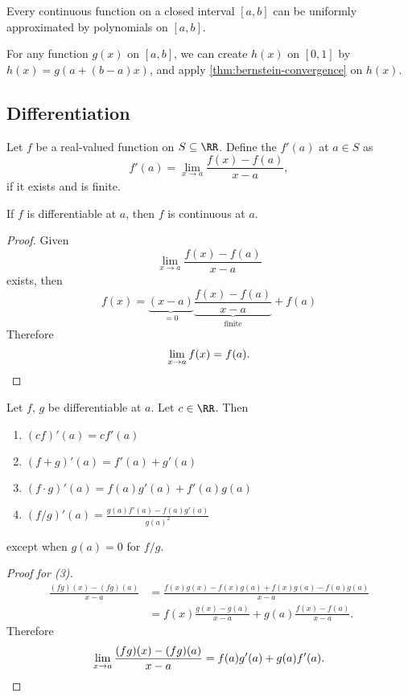 \documentclass[11pt]{scrartcl}
\numberwithin{equation}{section}
\begin{document}
\begin{theorem}
    \label{thm:weierstrassapproxthm}
    Every continuous function on a closed interval $[a,b]$  can 
    be uniformly approximated by polynomials on $[a,b]$.
\end{theorem}
For any function $g(x)$ on $[a,b]$, we can create $h(x)$ on $[0,1]$ 
by $h(x)=g(a+(b-a)x)$, and apply \cref{thm:bernstein-convergence} on $h(x)$.

\subsection{Differentiation}

\begin{definition}
    Let $f$ be a real-valued function on $S \subseteq \RR$.
    Define the  $f'(a)$ at $a\in S$ as 
    \[
        f'(a) = \lim_{x\rightarrow a}\frac{f(x)-f(a)}{x-a},
    \]
    if it exists and is finite.
\end{definition}
\begin{theorem}
    If $f$ is differentiable at $a$, then $f$ is continuous at $a$.
\end{theorem}
\begin{proof}
    Given 
    \[
        \lim_{x\rightarrow a}\frac{f(x)-f(a)}{x-a}
    \]
    exists, then 
    \[
        f(x) = \underbrace{(x-a)}_{=0}\underbrace{\frac{f(x)-f(a)}{x-a}}_{\text{finite}} + f(a)
    \]
    Therefore 
    \[
        \lim_{x\rightarrow a}f(x) = f(a).\qedhere
    \]
\end{proof}
\begin{proposition}
    Let $f$, $g$ be differentiable at $a$. Let $c\in \RR$.
    Then 
    \begin{enumerate}
        \item $(cf)'(a) = cf'(a)$
        \item $(f+g)'(a) = f'(a) + g'(a)$
        \item $(f\cdot g)'(a) = f(a)g'(a)+f'(a)g(a)$
        \item $(f/g)'(a) = \frac{g(a)f'(a)-f(a)g'(a)}{g(a)^2}$
    \end{enumerate}
    except when $g(a)=0$ for $f/g$.
\end{proposition}
\begin{proof}
    [Proof for (3)]
    \begin{align*}
        \frac{(fg)(x)-(fg)(a)}{x-a} &= \frac{f(x)g(x)-f(x)g(a)+f(x)g(a)-f(a)g(a)}{x-a} \\
        &= f(x)\frac{g(x)-g(a)}{x-a} + g(a)\frac{f(x)-f(a)}{x-a}.
    \end{align*}
    Therefore 
    \[
        \lim_{x\rightarrow a}\frac{(fg)(x)-(fg)(a)}{x-a} = f(a)g'(a) + g(a)f'(a). \qedhere
    \]
\end{proof}
\end{document}

